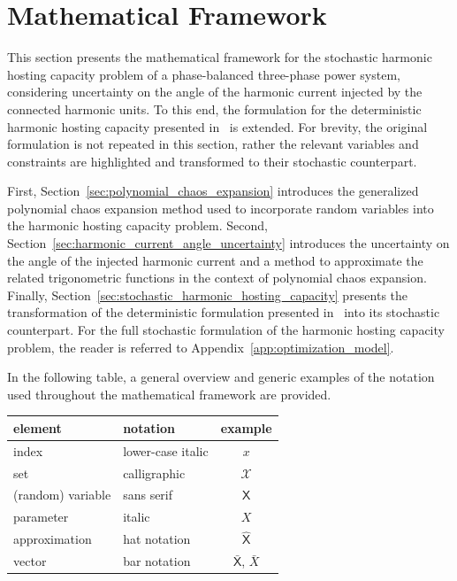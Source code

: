 \section{Mathematical Framework}
\label{sec:framework}

This section presents the mathematical framework for the stochastic harmonic hosting capacity problem of a phase-balanced three-phase power system, considering uncertainty on the angle of the harmonic current injected by the connected harmonic units. To this end, the formulation for the deterministic harmonic hosting capacity presented in~\cite{} is extended. For brevity, the original formulation is not repeated in this section, rather the relevant variables and constraints are highlighted and transformed to their stochastic counterpart. 

First, Section~\ref{sec:polynomial_chaos_expansion} introduces the generalized polynomial chaos expansion method used to incorporate random variables into the harmonic hosting capacity problem. Second, Section~\ref{sec:harmonic_current_angle_uncertainty} introduces the uncertainty on the angle of the injected harmonic current and a method to approximate the related trigonometric functions in the context of polynomial chaos expansion. Finally, Section~\ref{sec:stochastic_harmonic_hosting_capacity} presents the transformation of the deterministic formulation presented in~\cite{} into its stochastic counterpart. For the full stochastic formulation of the harmonic hosting capacity problem, the reader is referred to Appendix~\ref{app:optimization_model}. 

In the following table, a general overview and generic examples of the notation used throughout the mathematical framework are provided.
\begin{table}[ht!]
    \centering
    \begin{tabular}{ l l c }
        element             & notation                  & example                           \\ \hline
        index               & lower-case italic         & $x$                               \\
        set                 & calligraphic              & $\mathcal{X}$                     \\ 
        (random) variable   & sans serif                & $\mathsf{X}$                      \\
        parameter           & italic                    & $X$                               \\
        approximation       & hat notation              & $\hat{\mathsf{X}}$                \\
        vector              & bar notation              & $\bar{\mathsf{X}}$, $\bar{X}$
    \end{tabular}
\end{table}


